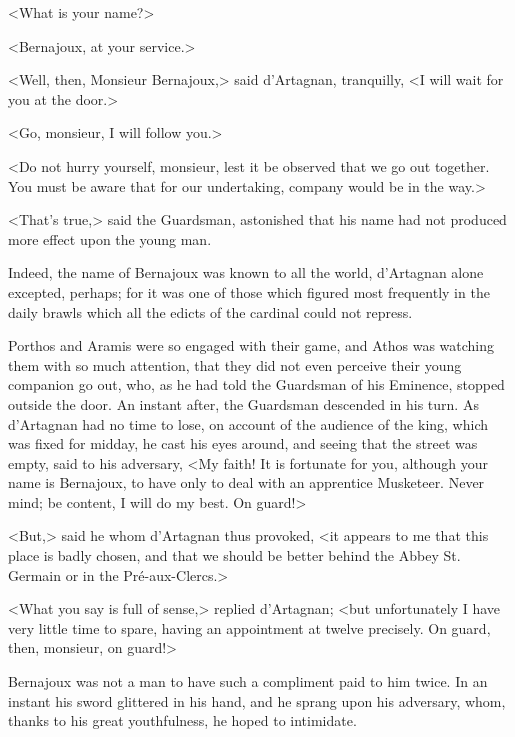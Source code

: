 <What is your name?> 

<Bernajoux, at your service.> 

<Well, then, Monsieur Bernajoux,> said d'Artagnan, tranquilly, <I will wait for you at the door.> 

<Go, monsieur, I will follow you.> 

<Do not hurry yourself, monsieur, lest it be observed that we go out together. You must be aware that for our undertaking, company would be in the way.> 

<That's true,> said the Guardsman, astonished that his name had not produced more effect upon the young man. 

Indeed, the name of Bernajoux was known to all the world, d'Artagnan alone excepted, perhaps; for it was one of those which figured most frequently in the daily brawls which all the edicts of the cardinal could not repress. 

Porthos and Aramis were so engaged with their game, and Athos was watching them with so much attention, that they did not even perceive their young companion go out, who, as he had told the Guardsman of his Eminence, stopped outside the door. An instant after, the Guardsman descended in his turn. As d'Artagnan had no time to lose, on account of the audience of the king, which was fixed for midday, he cast his eyes around, and seeing that the street was empty, said to his adversary, <My faith! It is fortunate for you, although your name is Bernajoux, to have only to deal with an apprentice Musketeer. Never mind; be content, I will do my best. On guard!> 

<But,> said he whom d'Artagnan thus provoked, <it appears to me that this place is badly chosen, and that we should be better behind the Abbey St. Germain or in the Pré-aux-Clercs.> 

<What you say is full of sense,> replied d'Artagnan; <but unfortunately I have very little time to spare, having an appointment at twelve precisely. On guard, then, monsieur, on guard!> 

Bernajoux was not a man to have such a compliment paid to him twice. In an instant his sword glittered in his hand, and he sprang upon his adversary, whom, thanks to his great youthfulness, he hoped to intimidate. 


